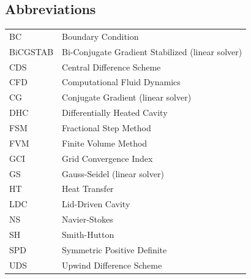 \subsection*{Abbreviations}
\begin{tabular}{@{}ll@{}}
    BC       & Boundary Condition \\
    BiCGSTAB & Bi-Conjugate Gradient Stabilized (linear solver) \\
    CDS      & Central Difference Scheme \\
    CFD      & Computational Fluid Dynamics \\
    CG       & Conjugate Gradient (linear solver) \\
    DHC      & Differentially Heated Cavity \\
    FSM      & Fractional Step Method \\
    FVM      & Finite Volume Method \\
    GCI      & Grid Convergence Index \\
    GS       & Gauss-Seidel (linear solver) \\
    HT       & Heat Transfer \\
    LDC      & Lid-Driven Cavity \\
    NS       & Navier-Stokes \\
    SH       & Smith-Hutton \\
    SPD      & Symmetric Positive Definite \\
    UDS      & Upwind Difference Scheme \\
\end{tabular}

